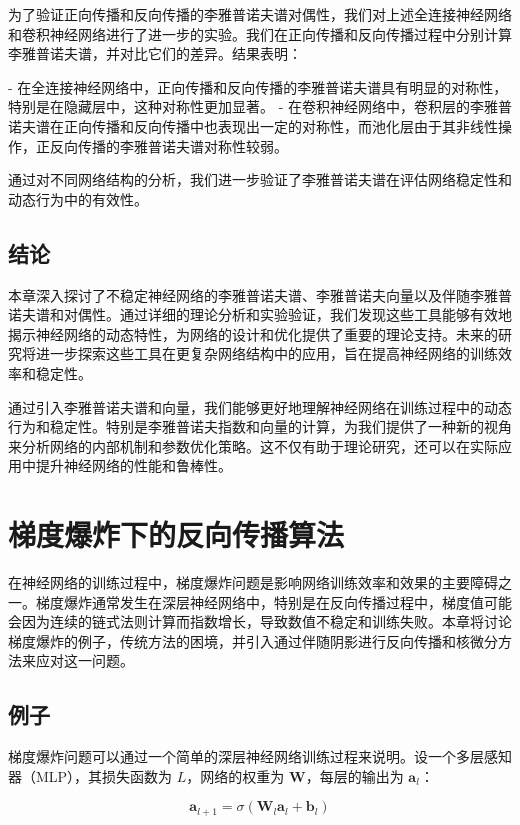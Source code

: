 \documentclass[12pt,a4paper]{amsart}
\begin{document}
为了验证正向传播和反向传播的李雅普诺夫谱对偶性，我们对上述全连接神经网络和卷积神经网络进行了进一步的实验。我们在正向传播和反向传播过程中分别计算李雅普诺夫谱，并对比它们的差异。结果表明：

- 在全连接神经网络中，正向传播和反向传播的李雅普诺夫谱具有明显的对称性，特别是在隐藏层中，这种对称性更加显著。
- 在卷积神经网络中，卷积层的李雅普诺夫谱在正向传播和反向传播中也表现出一定的对称性，而池化层由于其非线性操作，正反向传播的李雅普诺夫谱对称性较弱。

通过对不同网络结构的分析，我们进一步验证了李雅普诺夫谱在评估网络稳定性和动态行为中的有效性。

\subsection{结论}

本章深入探讨了不稳定神经网络的李雅普诺夫谱、李雅普诺夫向量以及伴随李雅普诺夫谱和对偶性。通过详细的理论分析和实验验证，我们发现这些工具能够有效地揭示神经网络的动态特性，为网络的设计和优化提供了重要的理论支持。未来的研究将进一步探索这些工具在更复杂网络结构中的应用，旨在提高神经网络的训练效率和稳定性。

通过引入李雅普诺夫谱和向量，我们能够更好地理解神经网络在训练过程中的动态行为和稳定性。特别是李雅普诺夫指数和向量的计算，为我们提供了一种新的视角来分析网络的内部机制和参数优化策略。这不仅有助于理论研究，还可以在实际应用中提升神经网络的性能和鲁棒性。

\section{梯度爆炸下的反向传播算法}

在神经网络的训练过程中，梯度爆炸问题是影响网络训练效率和效果的主要障碍之一。梯度爆炸通常发生在深层神经网络中，特别是在反向传播过程中，梯度值可能会因为连续的链式法则计算而指数增长，导致数值不稳定和训练失败。本章将讨论梯度爆炸的例子，传统方法的困境，并引入通过伴随阴影进行反向传播和核微分方法来应对这一问题。

\subsection{例子}

梯度爆炸问题可以通过一个简单的深层神经网络训练过程来说明。设一个多层感知器（MLP），其损失函数为 \( L \)，网络的权重为 \(\mathbf{W}\)，每层的输出为 \(\mathbf{a}_l\)：

\[ \mathbf{a}_{l+1} = \sigma(\mathbf{W}_l \mathbf{a}_l + \mathbf{b}_l) \]
\end{document}
